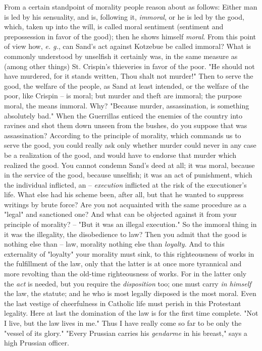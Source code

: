 From a certain standpoint of morality people reason about as follows: Either 
man is led by his sensuality, and is, following it, \textit{immoral}, or he is 
led by the good, which, taken up into the will, is called moral sentiment 
(sentiment and prepossession in favor of the good); then he shows himself 
\textit{moral}. From this point of view how, \textit{e. g.}, can Sand's act 
against Kotzebue be called immoral? What is commonly understood by unselfish 
it certainly was, in the same measure as (among other things) St. Crispin's 
thieveries in favor of the poor. "{}He should not have murdered, for it stands 
written, Thou shalt not murder!"{} Then to serve the good, the welfare of the 
people, as Sand at least intended, or the welfare of the poor, like Crispin -- 
is moral; but murder and theft are immoral; the purpose moral, the means 
immoral. Why? "{}Because murder, assassination, is something absolutely 
bad."{} When the Guerrillas enticed the enemies of the country into ravines 
and shot them down unseen from the bushes, do you suppose that was 
assassination? According to the principle of morality, which commands us to 
serve the good, you could really ask only whether murder could never in any 
case be a realization of the good, and would have to endorse that murder which 
realized the good. You cannot condemn Sand's deed at all; it was moral, 
because in the service of the good, because unselfish; it was an act of 
punishment, which the individual inflicted, an -- \textit{execution} inflicted 
at the risk of the executioner's life. What else had his scheme been, after 
all, but that he wanted to suppress writings by brute force? Are you not 
acquainted with the same procedure as a "{}legal"{} and sanctioned one? And 
what can be objected against it from your principle of morality? -- "{}But it 
was an illegal execution."{} So the immoral thing in it was the illegality, 
the disobedience to law? Then you admit that the good is nothing else than -- 
law, morality nothing else than \textit{loyalty}. And to this externality of 
"{}loyalty"{} your morality must sink, to this righteousness of works in the 
fulfillment of the law, only that the latter is at once more tyrannical and 
more revolting than the old-time righteousness of works. For in the latter 
only the \textit{act} is needed, but you require the \textit{disposition} too; 
one must carry \textit{in himself} the law, the statute; and he who is most 
legally disposed is the most moral. Even the last vestige of cheerfulness in 
Catholic life must perish in this Protestant legality. Here at last the 
domination of the law is for the first time complete. "{}Not I live, but the 
law lives in me."{} Thus I have really come so far to be only the "{}vessel of 
its glory."{} "{}Every Prussian carries his \textit{gendarme} in his 
breast,"{} says a high Prussian officer.

